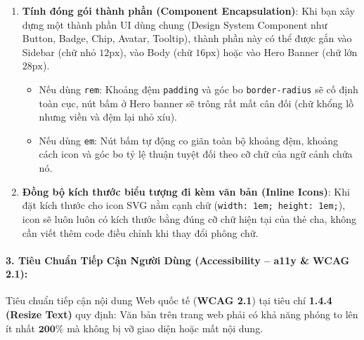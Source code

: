 \documentclass[11pt,oneside]{book}
\newcommand{\thd}[1]{\textcolor{white}{\textbf{\strut #1}}}
\newcommand{\codeinline}[1]{\textcolor{accentOrange}{\texttt{#1}}}
\newcommand{\term}[1]{\textbf{\textcolor{primaryBlue}{#1}}}
\begin{document}
\begin{enumerate}[leftmargin=1.5em, itemsep=3pt, parsep=0pt]
    \item \textbf{Tính đóng gói thành phần (\term{Component Encapsulation})}:
    Khi bạn xây dựng một thành phần UI dùng chung (Design System Component như Button, Badge, Chip, Avatar, Tooltip), thành phần này có thể được gắn vào Sidebar (chữ nhỏ $12\text{px}$), vào Body (chữ $16\text{px}$) hoặc vào Hero Banner (chữ lớn $28\text{px}$).
    \begin{itemize}[leftmargin=1.2em, itemsep=2pt]
        \item Nếu dùng \codeinline{rem}: Khoảng đệm \codeinline{padding} và góc bo \codeinline{border-radius} sẽ cố định toàn cục, nút bấm ở Hero banner sẽ trông rất mất cân đối (chữ khổng lồ nhưng viền và đệm lại nhỏ xíu).
        \item Nếu dùng \codeinline{em}: Nút bấm tự động co giãn toàn bộ khoảng đệm, khoảng cách icon và góc bo tỷ lệ thuận tuyệt đối theo cỡ chữ của ngữ cảnh chứa nó.
    \end{itemize}
    \item \textbf{Đồng bộ kích thước biểu tượng đi kèm văn bản (Inline Icons)}:
    Khi đặt kích thước cho icon SVG nằm cạnh chữ (\codeinline{width: 1em; height: 1em;}), icon sẽ luôn luôn có kích thước bằng đúng cỡ chữ hiện tại của thẻ cha, không cần viết thêm code điều chỉnh khi thay đổi phông chữ.
\end{enumerate}

\paragraph{3. Tiêu Chuẩn Tiếp Cận Người Dùng (Accessibility -- a11y \& WCAG 2.1):}
Tiêu chuẩn tiếp cận nội dung Web quốc tế (\term{WCAG 2.1}) tại tiêu chí \textbf{1.4.4 (Resize Text)} quy định: Văn bản trên trang web phải có khả năng phóng to lên ít nhất $\mathbf{200\%}$ mà không bị vỡ giao diện hoặc mất nội dung.

\begin{prettyTableBox}
\sffamily\small
{}
\end{prettyTableBox}
\end{document}
